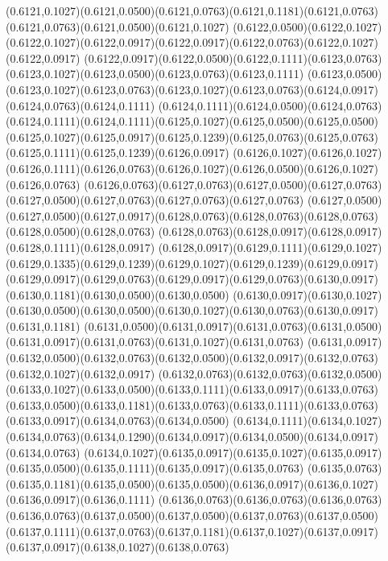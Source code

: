 (0.6121,0.1027)(0.6121,0.0500)(0.6121,0.0763)(0.6121,0.1181)(0.6121,0.0763)(0.6121,0.0763)(0.6121,0.0500)(0.6121,0.1027)
(0.6122,0.0500)(0.6122,0.1027)(0.6122,0.1027)(0.6122,0.0917)(0.6122,0.0917)(0.6122,0.0763)(0.6122,0.1027)(0.6122,0.0917)
(0.6122,0.0917)(0.6122,0.0500)(0.6122,0.1111)(0.6123,0.0763)(0.6123,0.1027)(0.6123,0.0500)(0.6123,0.0763)(0.6123,0.1111)
(0.6123,0.0500)(0.6123,0.1027)(0.6123,0.0763)(0.6123,0.1027)(0.6123,0.0763)(0.6124,0.0917)(0.6124,0.0763)(0.6124,0.1111)
(0.6124,0.1111)(0.6124,0.0500)(0.6124,0.0763)(0.6124,0.1111)(0.6124,0.1111)(0.6125,0.1027)(0.6125,0.0500)(0.6125,0.0500)
(0.6125,0.1027)(0.6125,0.0917)(0.6125,0.1239)(0.6125,0.0763)(0.6125,0.0763)(0.6125,0.1111)(0.6125,0.1239)(0.6126,0.0917)
(0.6126,0.1027)(0.6126,0.1027)(0.6126,0.1111)(0.6126,0.0763)(0.6126,0.1027)(0.6126,0.0500)(0.6126,0.1027)(0.6126,0.0763)
(0.6126,0.0763)(0.6127,0.0763)(0.6127,0.0500)(0.6127,0.0763)(0.6127,0.0500)(0.6127,0.0763)(0.6127,0.0763)(0.6127,0.0763)
(0.6127,0.0500)(0.6127,0.0500)(0.6127,0.0917)(0.6128,0.0763)(0.6128,0.0763)(0.6128,0.0763)(0.6128,0.0500)(0.6128,0.0763)
(0.6128,0.0763)(0.6128,0.0917)(0.6128,0.0917)(0.6128,0.1111)(0.6128,0.0917)
\PST@Solid(0.6128,0.0917)(0.6129,0.1111)(0.6129,0.1027)(0.6129,0.1335)(0.6129,0.1239)(0.6129,0.1027)(0.6129,0.1239)(0.6129,0.0917)
(0.6129,0.0917)(0.6129,0.0763)(0.6129,0.0917)(0.6129,0.0763)(0.6130,0.0917)(0.6130,0.1181)(0.6130,0.0500)(0.6130,0.0500)
(0.6130,0.0917)(0.6130,0.1027)(0.6130,0.0500)(0.6130,0.0500)(0.6130,0.1027)(0.6130,0.0763)(0.6130,0.0917)(0.6131,0.1181)
(0.6131,0.0500)(0.6131,0.0917)(0.6131,0.0763)(0.6131,0.0500)(0.6131,0.0917)(0.6131,0.0763)(0.6131,0.1027)(0.6131,0.0763)
(0.6131,0.0917)(0.6132,0.0500)(0.6132,0.0763)(0.6132,0.0500)(0.6132,0.0917)(0.6132,0.0763)(0.6132,0.1027)(0.6132,0.0917)
(0.6132,0.0763)(0.6132,0.0763)(0.6132,0.0500)(0.6133,0.1027)(0.6133,0.0500)(0.6133,0.1111)(0.6133,0.0917)(0.6133,0.0763)
(0.6133,0.0500)(0.6133,0.1181)(0.6133,0.0763)(0.6133,0.1111)(0.6133,0.0763)(0.6133,0.0917)(0.6134,0.0763)(0.6134,0.0500)
(0.6134,0.1111)(0.6134,0.1027)(0.6134,0.0763)(0.6134,0.1290)(0.6134,0.0917)(0.6134,0.0500)(0.6134,0.0917)(0.6134,0.0763)
(0.6134,0.1027)(0.6135,0.0917)(0.6135,0.1027)(0.6135,0.0917)(0.6135,0.0500)(0.6135,0.1111)(0.6135,0.0917)(0.6135,0.0763)
(0.6135,0.0763)(0.6135,0.1181)(0.6135,0.0500)(0.6135,0.0500)(0.6136,0.0917)(0.6136,0.1027)(0.6136,0.0917)(0.6136,0.1111)
(0.6136,0.0763)(0.6136,0.0763)(0.6136,0.0763)(0.6136,0.0763)(0.6137,0.0500)(0.6137,0.0500)(0.6137,0.0763)(0.6137,0.0500)
(0.6137,0.1111)(0.6137,0.0763)(0.6137,0.1181)(0.6137,0.1027)(0.6137,0.0917)(0.6137,0.0917)(0.6138,0.1027)(0.6138,0.0763)
